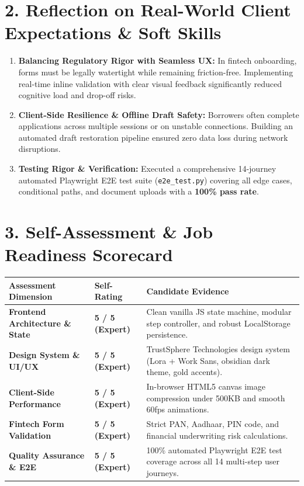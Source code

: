 \documentclass[11pt,a4paper]{article}
\begin{document}
\section{2. Reflection on Real-World Client Expectations \& Soft Skills}
\begin{enumerate}[leftmargin=1.5em, itemsep=3pt]
    \item \textbf{Balancing Regulatory Rigor with Seamless UX:} In fintech onboarding, forms must be legally watertight while remaining friction-free. Implementing real-time inline validation with clear visual feedback significantly reduced cognitive load and drop-off risks.
    \item \textbf{Client-Side Resilience \& Offline Draft Safety:} Borrowers often complete applications across multiple sessions or on unstable connections. Building an automated draft restoration pipeline ensured zero data loss during network disruptions.
    \item \textbf{Testing Rigor \& Verification:} Executed a comprehensive 14-journey automated Playwright E2E test suite (\texttt{e2e\_test.py}) covering all edge cases, conditional paths, and document uploads with a \textbf{100\% pass rate}.
\end{enumerate}

\section{3. Self-Assessment \& Job Readiness Scorecard}
\begin{table}[h]
\centering
\small
\begin{tabular}{@{}llp{8.5cm}@{}}
\toprule
\textbf{Assessment Dimension} & \textbf{Self-Rating} & \textbf{Candidate Evidence} \\ \midrule
\textbf{Frontend Architecture \& State} & \textbf{5 / 5 (Expert)} & Clean vanilla JS state machine, modular step controller, and robust LocalStorage persistence. \\
\textbf{Design System \& UI/UX} & \textbf{5 / 5 (Expert)} & TrustSphere Technologies design system (Lora + Work Sans, obsidian dark theme, gold accents). \\
\textbf{Client-Side Performance} & \textbf{5 / 5 (Expert)} & In-browser HTML5 canvas image compression under 500KB and smooth 60fps animations. \\
\textbf{Fintech Form Validation} & \textbf{5 / 5 (Expert)} & Strict PAN, Aadhaar, PIN code, and financial underwriting risk calculations. \\
\textbf{Quality Assurance \& E2E} & \textbf{5 / 5 (Expert)} & 100\% automated Playwright E2E test coverage across all 14 multi-step user journeys. \\ \bottomrule
\end{tabular}
\end{table}
\end{document}
